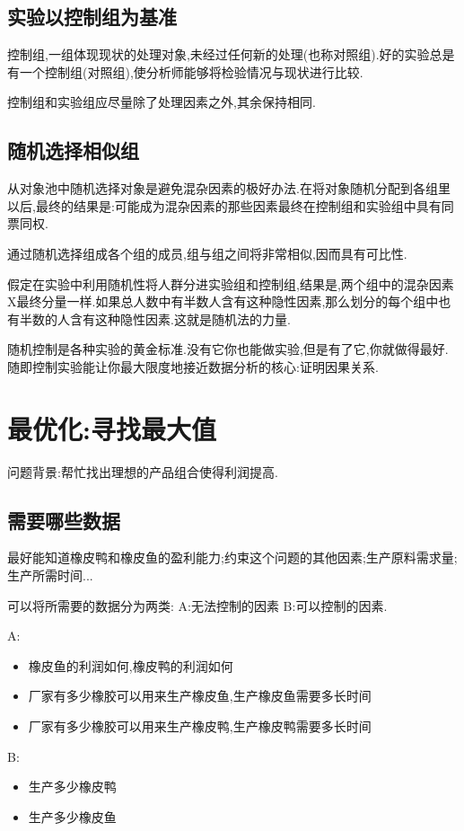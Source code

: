 \documentclass[11pt,a4paper,oneside]{book}
\begin{document}
\section{实验以控制组为基准}
控制组,一组体现现状的处理对象,未经过任何新的处理(也称对照组).好的实验总是有一个控制组(对照组),使分析师能够将检验情况与现状进行比较.

控制组和实验组应尽量除了处理因素之外,其余保持相同.
\section{随机选择相似组}
从对象池中随机选择对象是避免混杂因素的极好办法.在将对象随机分配到各组里以后,最终的结果是:可能成为混杂因素的那些因素最终在控制组和实验组中具有同票同权.

通过随机选择组成各个组的成员,组与组之间将非常相似,因而具有可比性.

\begin{tcolorbox}[colback=pink!10!white,colframe=pink!100!black]
	假定在实验中利用随机性将人群分进实验组和控制组,结果是,两个组中的混杂因素X最终分量一样.如果总人数中有半数人含有这种隐性因素,那么划分的每个组中也有半数的人含有这种隐性因素.这就是随机法的力量.
	
	随机控制是各种实验的黄金标准.没有它你也能做实验,但是有了它,你就做得最好.随即控制实验能让你最大限度地接近数据分析的核心:证明因果关系.
\end{tcolorbox}
\chapter{最优化:寻找最大值}
问题背景:帮忙找出理想的产品组合使得利润提高.

\section{需要哪些数据}
最好能知道橡皮鸭和橡皮鱼的盈利能力;约束这个问题的其他因素;生产原料需求量;生产所需时间...

可以将所需要的数据分为两类: A:无法控制的因素  B:可以控制的因素.

A:
\begin{itemize}
	\item 橡皮鱼的利润如何,橡皮鸭的利润如何
	\item 厂家有多少橡胶可以用来生产橡皮鱼,生产橡皮鱼需要多长时间
	\item 厂家有多少橡胶可以用来生产橡皮鸭,生产橡皮鸭需要多长时间
\end{itemize}

B:
\begin{itemize}
	\item 生产多少橡皮鸭
	\item 生产多少橡皮鱼
\end{itemize}
\end{document}
